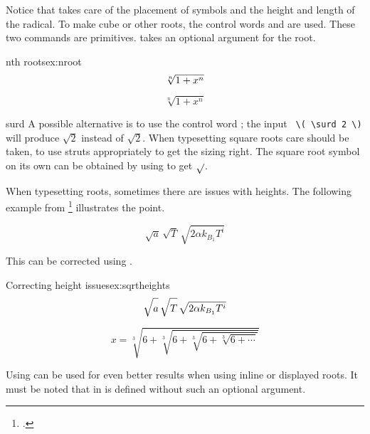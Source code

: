 {Notice that \tex takes care of the placement of
symbols and the height and length of the radical. To make cube or other roots, the control
words  and  are used. These two commands are \tex primitives. \latexe
{} takes an optional argument for the root.

\begin{texexample}{nth roots}{ex:nroot}
   \[\root n \of  {1+x^n}\]
   
   \[\sqrt[n]{1+x^n}\]
\end{texexample}

\begin{docCommand}{surd}{}
 A possible alternative is to use the control word ; the input  \verb+ \( \surd 2 \)+ will
produce \(\surd 2\) instead of \(\sqrt{2}\). When typesetting square roots care should be taken, to use struts appropriately to get the sizing right. The square root symbol on its own can be obtained by using
 to get $\sqrtsign{}$.
\end{docCommand}

When typesetting roots, sometimes there are issues with heights. The following example
from \footcite{mathmode} illustrates the point.

\begin{equation}
 \sqrt{a}\,%
 \sqrt{T}\,%
 \sqrt{2\alpha k_{B_1}T^i}\label{eq:root1}
\end{equation}

This can be corrected using . 

\begin{texexample}{Correcting height issues}{ex:sqrtheights}
\begin{equation}\label{eq:root2}
 \sqrt{a\vphantom{k_{B_1}T^i}}\,%
 \sqrt{T\vphantom{k_{B_1}T^i}}\,%
 \sqrt{2\alpha k_{B_1}T^i}
\end{equation}

\begin{equation}
x = \sqrt[3]{6+\sqrt[3]{6+\sqrt[3]{6+\sqrt[3]{6+\cdots}}}}
\end{equation}
\end{texexample}

Using   can be used for even better results when
using inline or displayed roots. It must be noted that  in \latexe is defined
without such an optional argument.

\makeatletter
\renewcommand{\smash}[1][tb]{%
\def\mb@t{\ht}\def\mb@b{\dp}\def\mb@tb{\ht\z@\z@\dp}%
\edef\finsm@sh{\csname mb@#1\endcsname\z@\z@ \box\z@}%
\ifmmode \@xp\mathpalette\@xp\mathsm@sh
\else \@xp\makesm@sh
\fi
}

}

